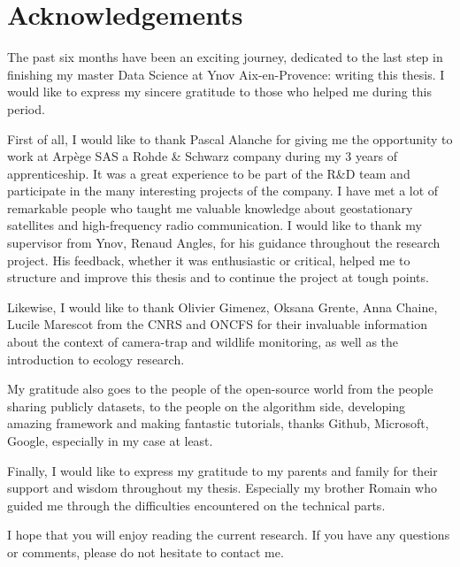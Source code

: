 
\chapter{Acknowledgements}
\begin{it}



The past six months have been an exciting journey, dedicated to the last step in finishing my master Data Science at Ynov Aix-en-Provence: writing this thesis. I would like to express my sincere gratitude to those who helped me during this period.

First of all, I would like to thank Pascal Alanche for giving me the opportunity to work at Arpège SAS a Rohde \& Schwarz company during my 3 years of apprenticeship. It was a great experience to be part of the R\&D team and participate in the many interesting projects of the company. I have met a lot of remarkable people who taught me valuable knowledge about geostationary satellites and high-frequency radio communication. I would like to thank my supervisor from Ynov, Renaud Angles, for his guidance throughout the research project. His feedback, whether it was enthusiastic or critical, helped me to structure and improve this thesis and to continue the project at tough points.

Likewise, I would like to thank Olivier Gimenez, Oksana Grente, Anna Chaine, Lucile Marescot from the CNRS and ONCFS for their invaluable information about the context of camera-trap and wildlife monitoring, as well as the introduction to ecology research.

My gratitude also goes to the people of the open-source world from the people sharing publicly datasets, to the people on the algorithm side, developing amazing framework and making fantastic tutorials, thanks Github, Microsoft, Google, especially in my case at least.

Finally, I would like to express my gratitude to my parents and family for their support and wisdom throughout my thesis. Especially my brother Romain who guided me through the difficulties encountered on the technical parts.

I hope that you will enjoy reading the current research. If you have any questions or comments, please do not hesitate to contact me.

\end{it}